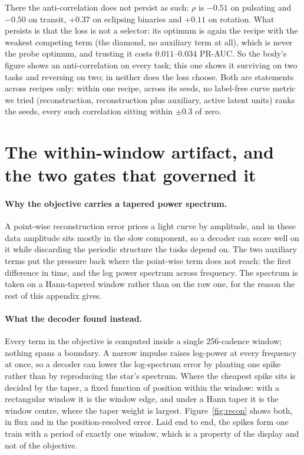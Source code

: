 \documentclass{article}
\begin{document}
There the anti-correlation does not persist as such: $\rho$ is $-0.51$ on pulsating and $-0.50$ on
transit, $+0.37$ on eclipsing binaries and $+0.11$ on rotation. What persists is that the loss is not
a selector: its optimum is again the recipe with the weakest competing term (the diamond, no
auxiliary term at all), which is never the probe optimum, and trusting it costs $0.011$--$0.034$
PR-AUC. So the body's figure shows an anti-correlation on every task; this one shows it surviving on
two tasks and reversing on two; in neither does the loss choose. Both are statements across recipes
only: within one recipe, across its seeds, no label-free curve metric we tried (reconstruction,
reconstruction plus auxiliary, active latent units) ranks the seeds, every such correlation sitting
within $\pm 0.3$ of zero.

\section{The within-window artifact, and the two gates that governed it}
\label{app:artifact}

\paragraph{Why the objective carries a tapered power spectrum.} A point-wise reconstruction error
prices a light curve by amplitude, and in these data amplitude sits mostly in the slow component, so
a decoder can score well on it while discarding the periodic structure the tasks depend on. The two
auxiliary terms put the pressure back where the point-wise term does not reach: the first difference
in time, and the log power spectrum across frequency. The spectrum is taken on a Hann-tapered window
rather than on the raw one, for the reason the rest of this appendix gives.

\paragraph{What the decoder found instead.} Every term in the objective is computed inside a single
256-cadence window; nothing spans a boundary. A narrow impulse raises log-power at every frequency at
once, so a decoder can lower the log-spectrum error by planting one spike rather than by reproducing
the star's spectrum. Where the cheapest spike sits is decided by the taper, a fixed function of
position within the window: with a rectangular window it is the window edge, and under a Hann taper
it is the window centre, where the taper weight is largest. Figure~\ref{fig:recon} shows both, in
flux and in the position-resolved error. Laid end to end, the spikes form one train with a period of
exactly one window, which is a property of the display and not of the objective.
\end{document}
